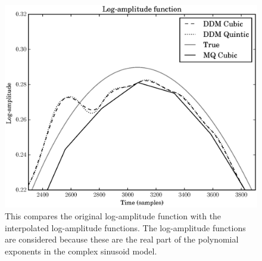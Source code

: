 \documentclass[letterpaper,12pt]{report}
\begin{document}
\begin{figure}
    \includegraphics[width=\textwidth]{plots/mq_mod_err_comp_logamp_func.eps}
    \caption{This compares the original log-amplitude function with the
    interpolated log-amplitude functions. The log-amplitude functions are
    considered because these are the real part of the polynomial exponents in
    the complex sinusoid model.
    \label{plot:mqmoderrcomplogampfunc}}
\end{figure}
\end{document}
